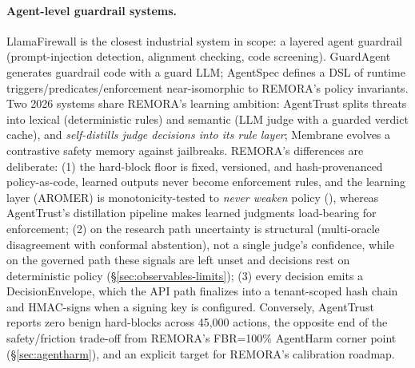 \documentclass[10pt,twocolumn]{article}
\begin{document}
\paragraph{Agent-level guardrail systems.}
LlamaFirewall \cite{chennabasappa2025llamafirewall} is the closest
industrial system in scope: a layered agent guardrail (prompt-injection
detection, alignment checking, code screening). GuardAgent
\cite{xiang2025guardagent} generates guardrail code with a guard LLM;
AgentSpec \cite{wang2025agentspec} defines a DSL of runtime
triggers/predicates/enforcement near-isomorphic to REMORA's policy
invariants. Two 2026 systems share REMORA's learning ambition: AgentTrust
\cite{yang2026agenttrust} splits threats into lexical (deterministic
rules) and semantic (LLM judge with a guarded verdict cache), and
\emph{self-distills judge decisions into its rule layer}; Membrane
\cite{choi2026membrane} evolves a contrastive safety memory against
jailbreaks. REMORA's differences are deliberate: (1) the hard-block floor
is fixed, versioned, and hash-provenanced policy-as-code, learned outputs
never become enforcement rules, and the learning layer (AROMER) is
monotonicity-tested to \emph{never weaken} policy
(),
whereas AgentTrust's distillation pipeline makes learned judgments
load-bearing for enforcement; (2) on the research path uncertainty is
structural (multi-oracle disagreement with conformal abstention), not a
single judge's confidence, while on the governed path these signals are
left unset and decisions rest on deterministic policy
(\S\ref{sec:observables-limits});
(3) every decision emits a DecisionEnvelope, which the API path
finalizes into a tenant-scoped hash chain and HMAC-signs when a signing
key is configured.
Conversely, AgentTrust reports zero benign hard-blocks across 45{,}000
actions, the opposite end of the safety/friction trade-off from REMORA's
FBR=100\% AgentHarm corner point (\S\ref{sec:agentharm}), and an explicit
target for REMORA's calibration roadmap.
\end{document}
